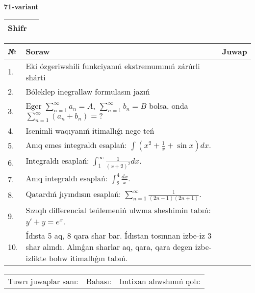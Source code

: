 \documentclass{article}
\begin{document}
  \egroup
  
  \newpage
  
  
  \textbf{71-variant}\\
  
  \bgroup
  \def\arraystretch{1.6} %
  
  \begin{tabular}{|m{5.7cm}|m{9.5cm}|}
  \hline
  Shifr & \\
  \hline
  \end{tabular}
  
  \vspace{1cm}
  
  \begin{tabular}{|m{0.7cm}|m{10cm}|m{4cm}|}
  \hline
  № & Soraw & Juwap \\
  \hline
  1. & Eki ózgeriwshili funkciyanıń ekstremumınıń zárúrli shárti &  \\
  \hline
  2. & Bóleklep inegrallaw formulasın jazıń &  \\
  \hline
  3. & Eger \(\sum_{n = 1}^{\infty}a_{n} = A,\ \sum_{n = 1}^{\infty}b_{n} = B\) bolsa, onda \(\sum_{n = 1}^{\infty}\left( a_{n} + b_{n} \right) = ?\) &  \\
  \hline
  4. & Isenimli waqıyanıń itimallıǵı nege teń &  \\
  \hline
  5. & Anıq emes integraldı esaplań: \(\int{\left( x^2  + \frac{1}{x} + \sin x \right)dx}\). &  \\
  \hline
  6. & Integraldı esaplań: \(\int_{1}^{\infty}{\frac{1}{(x + 2)^2 }dx}\). &  \\
  \hline
  7. & Anıq integraldı esaplań: \(\int_{2}^{4}\frac{dx}{x}\). &  \\
  \hline
  8. & Qatardıń jıyındısın esaplań: \(\sum_{n = 1}^{\infty}\frac{1}{(2n - 1)(2n + 1)}\). &  \\
  \hline
  9. & Sızıqlı differencial teńlemeniń ulwma sheshimin tabıń: \(y' + y = e^{x}\). &  \\
  \hline
  10. & Ídısta 5 aq, 8 qara shar bar. Ídıstan tosınnan izbe-iz 3 shar alındı. Alınǵan sharlar aq, qara, qara degen izbe-izlikte bolıw itimallıǵın tabıń. &  \\
  \hline
  \end{tabular}
  
  \vspace{1cm}
  
  \begin{tabular}{lll}
  Tuwrı juwaplar sanı: \underline{\hspace{1.5cm}} & 
  Bahası: \underline{\hspace{1.5cm}} & 
  Imtixan alıwshınıń qolı: \underline{\hspace{2cm}} \\
  \end{tabular}
  
\end{document}
